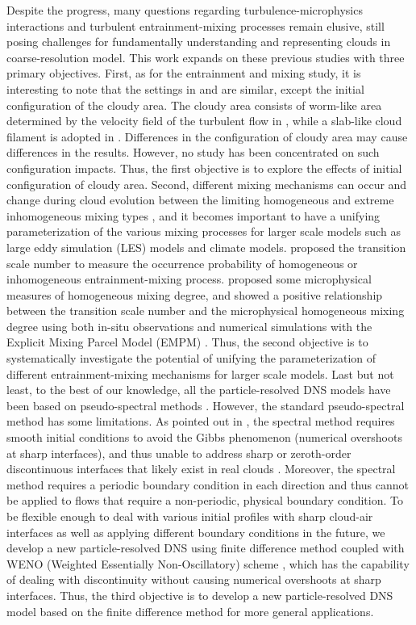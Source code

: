 \documentclass[draft,linenumbers]{agujournal}
\begin{document}
Despite the progress, many questions regarding turbulence-microphysics interactions and turbulent entrainment-mixing processes remain elusive, still posing challenges for fundamentally understanding and representing clouds in coarse-resolution model. This work expands on these previous studies with three primary objectives. First, as for the entrainment and mixing study, it is interesting to note that the settings in \citet{Kumar12} and \citet{And04} are similar, except the initial configuration of the cloudy area. The cloudy area consists of worm-like area determined by the velocity field of the turbulent flow in \citet{And04}, while a slab-like cloud filament is adopted in \citet{Kumar12}. Differences in the configuration of cloudy area may cause differences in the results. However, no study has been concentrated on such configuration impacts. Thus, the first objective is to explore the effects of initial configuration of cloudy area. Second, different mixing mechanisms can occur and change during cloud evolution between the limiting homogeneous and extreme inhomogeneous mixing types \citep{And09, Burnet1992, Lehmann2009}, and it becomes important to have a unifying parameterization of the various mixing processes for larger scale models such as large eddy simulation (LES) models and climate models. \citet{Lu2011} proposed the transition scale number to measure the occurrence probability of homogeneous or inhomogeneous entrainment-mixing process. \citet{Lu2013, Lu2014} proposed some microphysical measures of homogeneous mixing degree, and showed a positive relationship between the transition scale number and the microphysical homogeneous mixing degree using both in-situ observations and numerical simulations with the Explicit Mixing Parcel Model (EMPM) \citep{Krueger1997Modeling,Su1998}. Thus, the second objective is to systematically investigate the potential of unifying the parameterization of different entrainment-mixing mechanisms for larger scale models. Last but not least, to the best of our knowledge, all the particle-resolved DNS models have been based on pseudo-spectral methods \citep{Rogallo81, Orszag72, Celani05, Kumar12}. However, the standard pseudo-spectral method has some limitations. As pointed out in \citet{Kumar12}, the spectral method requires smooth initial conditions to avoid the Gibbs phenomenon (numerical overshoots at sharp interfaces), and thus unable to address sharp or zeroth-order discontinuous interfaces that likely exist in real clouds \citep{Brenguier1993}. Moreover, the spectral method requires a periodic boundary condition in each direction and thus cannot be applied to flows that require a non-periodic, physical boundary condition. To be flexible enough to deal with various initial profiles with sharp cloud-air interfaces as well as applying different boundary conditions in the future, we develop a new particle-resolved DNS using finite difference method coupled with WENO (Weighted Essentially Non-Oscillatory) scheme \citep{JiangShu1996}, which has the capability of dealing with discontinuity without causing numerical overshoots at sharp interfaces. Thus, the third objective is to develop a new particle-resolved DNS model based on the finite difference method for more general applications.
\end{document}
